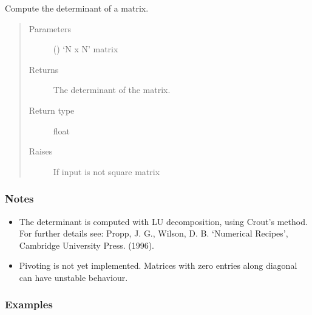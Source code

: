 \documentclass[letterpaper,10pt,english]{sphinxmanual}
\begin{document}
\begin{fulllineitems}
Compute the determinant of a matrix.
\begin{quote}\begin{description}
\item[{Parameters}] \leavevmode
{} () \textendash{} ‘N x N’ matrix

\item[{Returns}] \leavevmode
{} \textendash{} The determinant of the matrix.

\item[{Return type}] \leavevmode
float

\item[{Raises}] \leavevmode
{} \textendash{} If input is not square matrix

\end{description}\end{quote}
\subsubsection*{Notes}
\begin{itemize}
\item {} 
The determinant is computed with LU decomposition, using Crout’s method.
For further details see: Propp, J. G., Wilson, D. B. ‘Numerical Recipes’,
Cambridge University Press. (1996).

\item {} 
Pivoting is not yet implemented. Matrices with zero entries along
diagonal can have unstable behaviour.

\end{itemize}
\subsubsection*{Examples}

\begin{sphinxVerbatim}[commandchars=\\\{\}]
\PYG{p}{[}\PYG{p}{[}  \PYG{p}{]} \PYG{p}{[}  \PYG{p}{]} \PYG{p}{[}  \PYG{p}{]}\PYG{p}{]}
\PYG{p}{[}\PYG{p}{[} \PYG{p}{]} \PYG{p}{[} \PYG{p}{]}\PYG{p}{]}
\end{sphinxVerbatim}

\end{fulllineitems}
\end{document}
